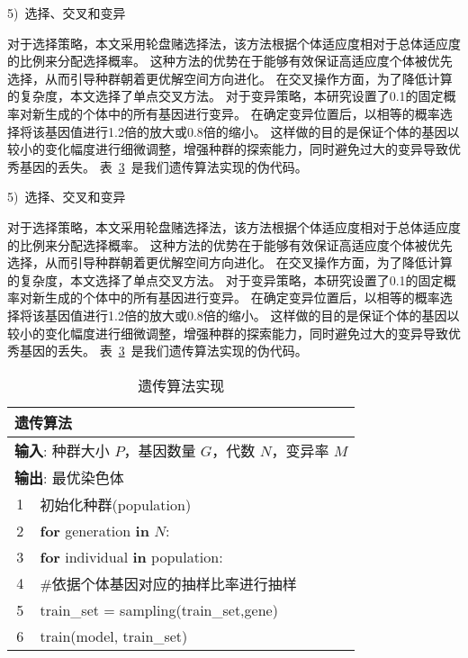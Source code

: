 \begin{table}[h]
5)~选择、交叉和变异\par
对于选择策略，本文采用轮盘赌选择法，该方法根据个体适应度相对于总体适应度的比例来分配选择概率。
这种方法的优势在于能够有效保证高适应度个体被优先选择，从而引导种群朝着更优解空间方向进化。
在交叉操作方面，为了降低计算的复杂度，本文选择了单点交叉方法。
对于变异策略，本研究设置了0.1的固定概率对新生成的个体中的所有基因进行变异。
在确定变异位置后，以相等的概率选择将该基因值进行1.2倍的放大或0.8倍的缩小。
这样做的目的是保证个体的基因以较小的变化幅度进行细微调整，增强种群的探索能力，同时避免过大的变异导致优秀基因的丢失。
表~\ref{tab:genetic_algorithm}~是我们遗传算法实现的伪代码。
\begin{table}[h]
5)~选择、交叉和变异\par
对于选择策略，本文采用轮盘赌选择法，该方法根据个体适应度相对于总体适应度的比例来分配选择概率。
这种方法的优势在于能够有效保证高适应度个体被优先选择，从而引导种群朝着更优解空间方向进化。
在交叉操作方面，为了降低计算的复杂度，本文选择了单点交叉方法。
对于变异策略，本研究设置了0.1的固定概率对新生成的个体中的所有基因进行变异。
在确定变异位置后，以相等的概率选择将该基因值进行1.2倍的放大或0.8倍的缩小。
这样做的目的是保证个体的基因以较小的变化幅度进行细微调整，增强种群的探索能力，同时避免过大的变异导致优秀基因的丢失。
表~\ref{tab:genetic_algorithm}~是我们遗传算法实现的伪代码。
\begin{table}[h]
	\caption{遗传算法实现}
	\label{tab:genetic_algorithm}
	\centering
	\begin{tabularx}{1.0\textwidth}{cl}
		\toprule
		\multicolumn{2}{l}{\textbf{遗传算法}}                                               \\
		\midrule
		\multicolumn{2}{l}{\textbf{输入}: 种群大小 $P$，基因数量 $G$，代数 $N$，变异率 $M$} \\
		\multicolumn{2}{l}{\textbf{输出}: 最优染色体}                                       \\
		1  & 初始化种群(population)                                                         \\
		2  & \textbf{for} generation \textbf{in} $N$:                                       \\
		3  & \quad \textbf{for} individual \textbf{in} population:                          \\
		4  & \quad\quad \#依据个体基因对应的抽样比率进行抽样                                \\
		5  & \quad\quad train\_set = sampling(train\_set,gene)                              \\
		6  & \quad\quad train(model, train\_set)                                            \\

\end{tabularx}
\end{table}
\end{table}
\end{table}
